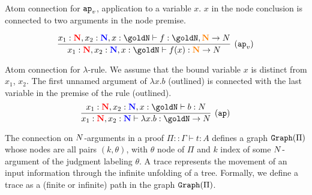 \begin{Eg}\label{eg:3}%
Atom connection for $\apvar$, application to a variable $x$. $x$ in the node 
conclusion is connected to two arguments in the node premise.

\[
\infer[(\apvar)]{
  x_1 : \bfColor{red}{\N},{x_2} : \bfColor{blue}{\N}, x  : \goldN
  \prove f(x) : \bfColor{orange}{\N} \rightarrow \N
}{
  x_1 : \bfColor{red}{\N},{x_2} : \bfColor{blue}{\N}, x  : \goldN
  \prove f : \goldN, \bfColor{orange}{\N} \rightarrow \N
}
\]
\end{Eg}



\begin{Eg}\label{eg:4}%
Atom connection for  $\lambda$-rule.
We assume that the bound variable $x$ is  distinct from $x_1$, $x_2$.
The first unnamed argument of $\lambda x.b$ (outlined)
is connected with the last variable in the premise of the rule (outlined).
\[
\infer[(\ap)]{
  x_1: \bfColor{red}{\N}, x_2: \bfColor{blue}{\N}
  \prove \lambda x.b : \goldN \rightarrow \N
}{
  x_1: \bfColor{red}{\N}, x_2: \bfColor{blue}{\N}, x:\goldN \prove b : \N
}
\]
\end{Eg}




The connection on ${N}$-arguments in a proof $\Pi::\Gamma\vdash t:A$ defines a 
graph ${\tt Graph}(\Pi)$ whose nodes are all pairs $(k,\theta)$, with $\theta$ node of $\Pi$ and 
$k$ index of some ${N}$-argument of  the judgment labeling $\theta$. 
A trace represents the movement of an input information through the 
infinite unfolding of a tree. Formally, we define a trace as a (finite or infinite) path 
in the graph ${\tt Graph}(\Pi)$.

